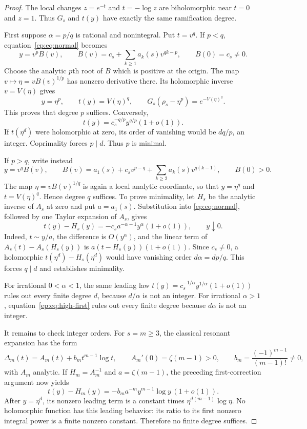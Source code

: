 \begin{proof}
The local changes $z=e^{-t}$ and $t=-\log z$ are biholomorphic near
$t=0$ and $z=1$. Thus $G_s$ and $t(y)$ have exactly the same
ramification degree.

First suppose $\alpha=p/q$ is rational and nonintegral. Put $t=v^q$.
If $p<q$, equation~\eqref{ep:eq:normal} becomes
\[
 y=v^p B(v),\qquad
 B(v)=c_s+\sum_{k\ge1}a_k(s)v^{qk-p},\qquad B(0)=c_s\ne0.
\]
Choose the analytic $p$th root of $B$ which is positive at the origin.
The map $v\mapsto\eta=vB(v)^{1/p}$ has nonzero derivative there.
Its holomorphic inverse $v=V(\eta)$ gives
\[
 y=\eta^p,\qquad t(y)=V(\eta)^q,\qquad
 G_s(\rho_s-\eta^p)=e^{-V(\eta)^q}.
\]
This proves that degree $p$ suffices. Conversely,
\begin{equation}
 t(y)=c_s^{-q/p}y^{q/p}(1+o(1)).
 \label{ep:eq:low-leading}
\end{equation}
If $t(\eta^d)$ were holomorphic at zero, its order of vanishing
would be $dq/p$, an integer. Coprimality forces $p\mid d$.
Thus $p$ is minimal.

If $p>q$, write instead
\[
 y=v^q B(v),\qquad
 B(v)=a_1(s)+c_s v^{p-q}
            +\sum_{k\ge2}a_k(s)v^{q(k-1)},\qquad B(0)>0.
\]
The map $\eta=vB(v)^{1/q}$ is again a local analytic coordinate,
so that $y=\eta^q$ and $t=V(\eta)^q$. Hence degree $q$ suffices.
To prove minimality, let $H_s$ be the analytic inverse of $A_s$ at
zero and put $a=a_1(s)$. Substitution into
\eqref{ep:eq:normal}, followed by one Taylor expansion of $A_s$,
gives
\begin{equation}
 t(y)-H_s(y)
   =-c_s a^{-\alpha-1}y^{\alpha}(1+o(1)),
 \qquad y\downarrow0.
 \label{ep:eq:high-first}
\end{equation}
Indeed, $t\sim y/a$, the difference is $O(y^{\alpha})$, and the
linear term of $A_s(t)-A_s(H_s(y))$ is
$a(t-H_s(y))(1+o(1))$. Since $c_s\ne0$, a holomorphic
$t(\eta^d)-H_s(\eta^d)$ would have vanishing order $d\alpha=dp/q$.
This forces $q\mid d$ and establishes minimality.

For irrational $0<\alpha<1$, the same leading law
$t(y)=c_s^{-1/\alpha}y^{1/\alpha}(1+o(1))$ rules out every finite
degree $d$, because $d/\alpha$ is not an integer. For irrational
$\alpha>1$, equation~\eqref{ep:eq:high-first} rules out every
finite degree because $d\alpha$ is not an integer.

It remains to check integer orders. For $s=m\ge3$, the classical
resonant expansion has the form
\begin{equation}
 \Delta_m(t)=A_m(t)+b_m t^{m-1}\log t,
 \qquad A_m'(0)=\zeta(m-1)>0,
 \qquad b_m=\frac{(-1)^{m-1}}{(m-1)!}\ne0,
 \label{ep:eq:integer}
\end{equation}
with $A_m$ analytic. If $H_m=A_m^{-1}$ and $a=\zeta(m-1)$,
the preceding first-correction argument now yields
\begin{equation}
 t(y)-H_m(y)
   =-b_m a^{-m}y^{m-1}\log y\,(1+o(1)).
 \label{ep:eq:integer-first}
\end{equation}
After $y=\eta^d$, its nonzero leading term is a constant times
$\eta^{d(m-1)}\log\eta$. No holomorphic function has this
leading behavior: its ratio to its first nonzero integral power is
a finite nonzero constant. Therefore no finite degree suffices.


\end{proof}
